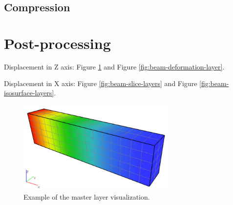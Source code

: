 \subsection {Compression}

\section{Post-processing}
\label{sec:postprocessing}



Displacement in Z axis: Figure \ref{fig:beam-master-layer} and Figure \ref{fig:beam-deformation-layer}.

Displacement in X axis: Figure \ref{fig:beam-slice-layers} and Figure \ref{fig:beam-isosurface-layers}.

\begin{figure}[H]
    \centering
    \includegraphics[width=0.7\textwidth]{figures/chapter-data-management/beam-master-layer}
    \decoRule
    \caption{Example of the master layer visualization.}
    \label{fig:beam-master-layer}
\end{figure}

